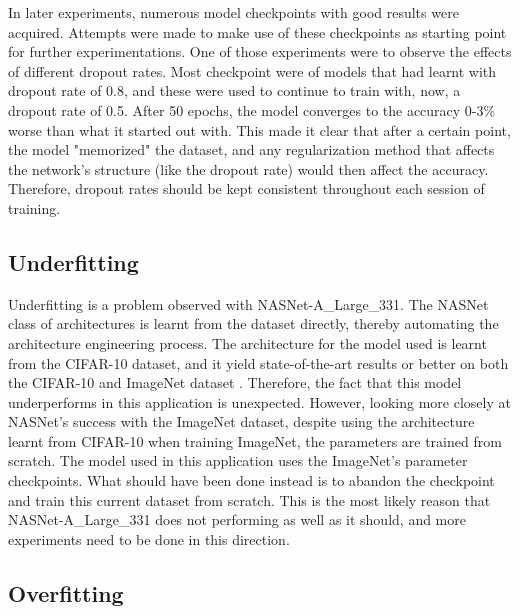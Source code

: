 \documentclass[a4paper]{article}
\begin{document}
In later experiments, numerous model checkpoints with good results were acquired. Attempts were made to make use of these checkpoints as starting point for further experimentations. One of those experiments were to observe the effects of different dropout rates. Most checkpoint were of models that had learnt with dropout rate of 0.8, and these were used to continue to train with, now, a dropout rate of 0.5. After 50 epochs, the model converges to the accuracy 0-3\% worse than what it started out with. This made it clear that after a certain point, the model "memorized" the dataset, and any regularization method that affects the network's structure (like the dropout rate) would then affect the accuracy. Therefore, dropout rates should be kept consistent throughout each session of training.

\subsection{Underfitting}

Underfitting is a problem observed with NASNet-A\_Large\_331. The NASNet class of architectures is learnt from the dataset directly, thereby automating the architecture engineering process. The architecture for the model used is learnt from the CIFAR-10 dataset, and it yield state-of-the-art results or better on both the CIFAR-10 and ImageNet dataset \cite{Zoph2017}. Therefore, the fact that this model underperforms in this application is unexpected. However, looking more closely at NASNet's success with the ImageNet dataset, despite using the architecture learnt from CIFAR-10 when training ImageNet, the parameters are trained from scratch. The model used in this application uses the ImageNet's parameter checkpoints. What should have been done instead is to abandon the checkpoint and train this current dataset from scratch. This is the most likely reason that NASNet-A\_Large\_331 does not performing as well as it should, and more experiments need to be done in this direction.

\subsection{Overfitting}
\end{document}
